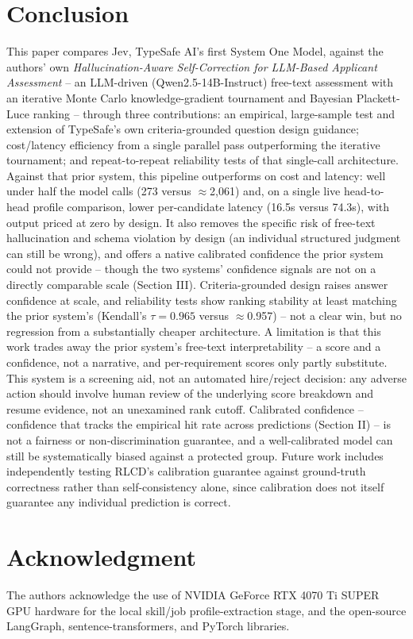 \documentclass[journal]{IEEEtran}
\begin{document}
\section{Conclusion}
This paper compares Jev, TypeSafe AI's first System One Model, against the authors' own \emph{Hallucination-Aware Self-Correction for LLM-Based Applicant Assessment} \cite{ref2} -- an LLM-driven (Qwen2.5-14B-Instruct) free-text assessment with an iterative Monte Carlo knowledge-gradient tournament and Bayesian Plackett-Luce ranking -- through three contributions: an empirical, large-sample test and extension of TypeSafe's own criteria-grounded question design guidance; cost/latency efficiency from a single parallel pass outperforming the iterative tournament; and repeat-to-repeat reliability tests of that single-call architecture. Against that prior system, this pipeline outperforms on cost and latency: well under half the model calls (273 versus $\approx$2,061) and, on a single live head-to-head profile comparison, lower per-candidate latency (16.5s versus 74.3s), with output priced at zero by design. It also removes the specific risk of free-text hallucination and schema violation by design (an individual structured judgment can still be wrong), and offers a native calibrated confidence the prior system could not provide -- though the two systems' confidence signals are not on a directly comparable scale (Section III). Criteria-grounded design raises answer confidence at scale, and reliability tests show ranking stability at least matching the prior system's (Kendall's $\tau=0.965$ versus $\approx$0.957) -- not a clear win, but no regression from a substantially cheaper architecture.
A limitation is that this work trades away the prior system's free-text interpretability -- a score and a confidence, not a narrative, and per-requirement scores only partly substitute.
This system is a screening aid, not an automated hire/reject decision: any adverse action should involve human review of the underlying score breakdown and resume evidence, not an unexamined rank cutoff. Calibrated confidence -- confidence that tracks the empirical hit rate across predictions (Section II) -- is not a fairness or non-discrimination guarantee, and a well-calibrated model can still be systematically biased against a protected group.
Future work includes independently testing RLCD's calibration guarantee against ground-truth correctness rather than self-consistency alone, since calibration does not itself guarantee any individual prediction is correct.

\section*{Acknowledgment}
The authors acknowledge the use of NVIDIA GeForce RTX 4070 Ti SUPER GPU hardware for the local skill/job profile-extraction stage, and the open-source LangGraph, sentence-transformers, and PyTorch libraries.
\end{document}
